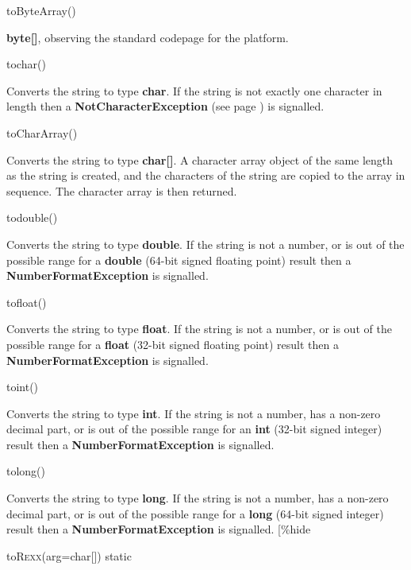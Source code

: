 \begin{description}
\item{toByteArray()}

\textbf{byte[]}, observing the standard codepage for the platform. 

\item{tochar()}

Converts the string to type \textbf{char}.  If the string is
not exactly one character in length then
a  \textbf{NotCharacterException} (see page \pageref{refexpnce})  is signalled.
\item{toCharArray()}

Converts the string to type \textbf{char[]}.  A character array object
of the same length as the string is created, and the characters of the
string are copied to the array in sequence.  The character array is then
returned.
\item{todouble()}

Converts the string to type \textbf{double}.  If the string is
not a number, or is out of the possible range for a \textbf{double}
(64-bit signed floating point) result then a \textbf{NumberFormatException}
is signalled.
\item{tofloat()}

Converts the string to type \textbf{float}.  If the string is
not a number, or is out of the possible range for a \textbf{float}
(32-bit signed floating point) result then a \textbf{NumberFormatException}
is signalled.
\item{toint()}

Converts the string to type \textbf{int}.  If the string is
not a number, has a non-zero decimal part, or is out of the possible
range for an \textbf{int} (32-bit signed integer) result then
a \textbf{NumberFormatException} is signalled.
\item{tolong()}

Converts the string to type \textbf{long}.  If the string is
not a number, has a non-zero decimal part, or is out of the possible
range for a \textbf{long} (64-bit signed integer) result then
a \textbf{NumberFormatException} is signalled.
[\%hide
\item{toR\textsc{exx}(arg=char[]) static}


\end{description}
